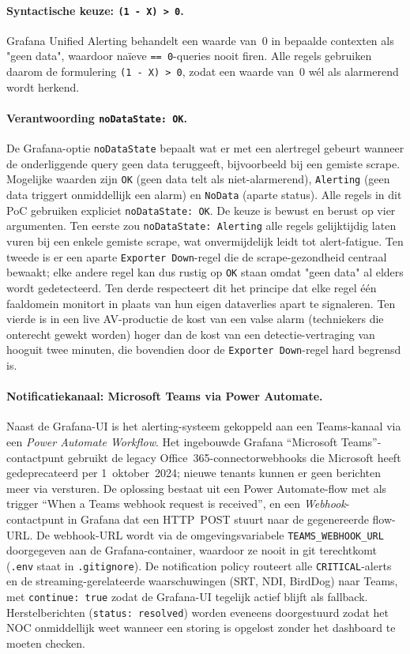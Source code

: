 \paragraph{Syntactische keuze: \texttt{(1 - X) > 0}.} Grafana Unified Alerting behandelt een waarde van~0 in bepaalde contexten als "geen data", waardoor naïeve \texttt{== 0}-queries nooit firen. Alle regels gebruiken daarom de formulering \texttt{(1 - X) > 0}, zodat een waarde van~0 wél als alarmerend wordt herkend.

\paragraph{Verantwoording \texttt{noDataState: OK}.} De Grafana-optie \texttt{noDataState} bepaalt wat er met een alertregel gebeurt wanneer de onderliggende query geen data teruggeeft, bijvoorbeeld bij een gemiste scrape. Mogelijke waarden zijn \texttt{OK} (geen data telt als niet-alarmerend), \texttt{Alerting} (geen data triggert onmiddellijk een alarm) en \texttt{NoData} (aparte status). Alle regels in dit PoC gebruiken expliciet \texttt{noDataState: OK}. De keuze is bewust en berust op vier argumenten. Ten eerste zou \texttt{noDataState: Alerting} alle regels gelijktijdig laten vuren bij een enkele gemiste scrape, wat onvermijdelijk leidt tot alert-fatigue. Ten tweede is er een aparte \texttt{Exporter Down}-regel die de scrape-gezondheid centraal bewaakt; elke andere regel kan dus rustig op \texttt{OK} staan omdat "geen data" al elders wordt gedetecteerd. Ten derde respecteert dit het principe dat elke regel één faaldomein monitort in plaats van hun eigen dataverlies apart te signaleren. Ten vierde is in een live AV-productie de kost van een valse alarm (techniekers die onterecht gewekt worden) hoger dan de kost van een detectie-vertraging van hooguit twee minuten, die bovendien door de \texttt{Exporter Down}-regel hard begrensd is.

\paragraph{Notificatiekanaal: Microsoft Teams via Power Automate.}
Naast de Grafana-UI is het alerting-systeem gekoppeld aan een Teams-kanaal via een \emph{Power Automate Workflow}. Het ingebouwde Grafana ``Microsoft Teams''-contactpunt gebruikt de legacy Office~365-connectorwebhooks die Microsoft heeft gedeprecateerd per 1~oktober~2024; nieuwe tenants kunnen er geen berichten meer via versturen. De oplossing bestaat uit een Power Automate-flow met als trigger ``When a Teams webhook request is received'', en een \emph{Webhook}-contactpunt in Grafana dat een HTTP~POST stuurt naar de gegenereerde flow-URL. De webhook-URL wordt via de omgevingsvariabele \texttt{TEAMS\_WEBHOOK\_URL} doorgegeven aan de Grafana-container, waardoor ze nooit in git terechtkomt (\texttt{.env} staat in \texttt{.gitignore}). De notification policy routeert alle \texttt{CRITICAL}-alerts en de streaming-gerelateerde waarschuwingen (SRT, NDI, BirdDog) naar Teams, met \texttt{continue:~true} zodat de Grafana-UI tegelijk actief blijft als fallback. Herstelberichten (\texttt{status: resolved}) worden eveneens doorgestuurd zodat het NOC onmiddellijk weet wanneer een storing is opgelost zonder het dashboard te moeten checken.

